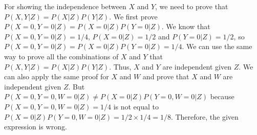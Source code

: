 \documentclass[11pt]{article}
\begin{document}
\begin{enumerate}[(a)]
\begin{center}
\end{center}
For showing the independence between $X$ and $Y$, we need to prove that $P(X, Y|Z) = P(X|Z)P(Y|Z)$. We first prove $P(X=0, Y=0|Z) = P(X=0|Z)P(Y=0|Z)$. We know that $P(X=0, Y=0|Z) = 1/4$, $P(X=0|Z) = 1/2$ and $P(Y=0|Z) = 1/2$, so $P(X=0, Y=0|Z) = P(X=0|Z)P(Y=0|Z) = 1/4$. We can use the same way to prove all the combinations of $X$ and $Y$ that $P(X, Y|Z) = P(X|Z)P(Y|Z)$. Thus, $X$ and $Y$ are independent given $Z$. We can also apply the same proof for $X$ and $W$ and prove that $X$ and $W$ are independent given $Z$. But $P(X=0, Y=0, W=0|Z) \neq P(X=0|Z)P(Y=0, W=0|Z)$ because $P(X=0, Y=0, W=0|Z) = 1/4$ is not equal to $P(X=0|Z)P(Y=0, W=0|Z) = 1/2 \times 1/4 = 1/8$. Therefore, the given expression is wrong.

\end{enumerate}
\end{document}
